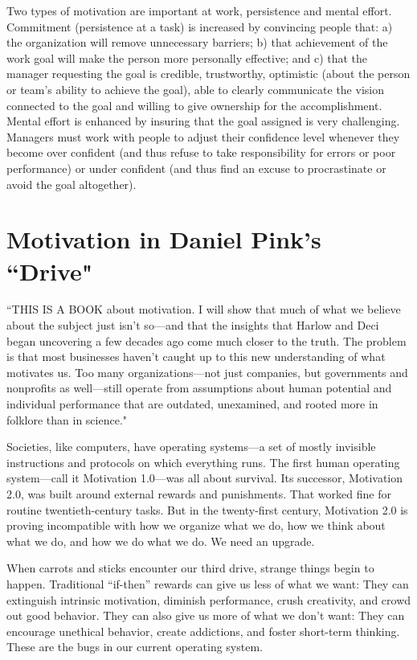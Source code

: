 Two types of motivation are important at work, persistence and mental effort. Commitment (persistence at a task) is increased by convincing people that: a) the organization will remove unnecessary barriers; b) that achievement of the work goal will make the person more personally effective; and c) that the manager requesting the goal is credible, trustworthy, optimistic (about the person or team’s ability to achieve the goal), able to clearly communicate the vision connected to the goal and willing to give ownership for the accomplishment. Mental effort is enhanced by insuring that the goal assigned is very challenging. Managers must work with people to adjust their confidence level whenever they become over confident (and thus refuse to take responsibility for errors or poor performance) or under confident (and thus find an excuse to procrastinate or avoid the goal altogether).

\section{Motivation in Daniel Pink's ``Drive"}

``THIS IS A BOOK about motivation. I will show that much of what we believe about the subject just isn’t so—and that the insights that Harlow and Deci began uncovering a few decades ago come much closer to the truth. The problem is that most businesses haven’t caught up to this new understanding of what motivates us. Too many organizations—not just companies, but governments and nonprofits as well—still operate from assumptions about human potential and individual performance that are outdated, unexamined, and rooted more in folklore than in science."

Societies, like computers, have operating systems—a set of mostly invisible instructions and protocols on which everything runs. The first human operating system—call it Motivation 1.0—was all about survival. Its successor, Motivation 2.0, was built around external rewards and punishments. That worked fine for routine twentieth-century tasks. But in the twenty-first century, Motivation 2.0 is proving incompatible with how we organize what we do, how we think about what we do, and how we do what we do. We need an upgrade.

When carrots and sticks encounter our third drive, strange things begin to happen. Traditional “if-then” rewards can give us less of what we want: They can extinguish intrinsic motivation, diminish performance, crush creativity, and crowd out good behavior. They can also give us more of what we don’t want: They can encourage unethical behavior, create addictions, and foster short-term thinking. These are the bugs in our current operating system.

